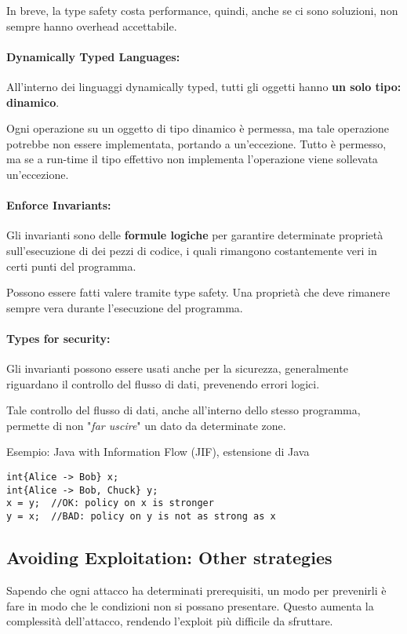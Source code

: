 In breve, la type safety costa performance, quindi, anche se ci sono soluzioni, non sempre hanno overhead accettabile. 

\paragraph{Dynamically Typed Languages:} All'interno dei linguaggi dynamically typed, tutti gli oggetti hanno \textbf{un solo tipo: dinamico}. 

Ogni operazione su un oggetto di tipo dinamico è permessa, ma tale operazione potrebbe non essere implementata, portando a un'eccezione. Tutto è permesso, ma se a run-time il tipo effettivo non implementa l'operazione viene sollevata un'eccezione.

\paragraph{Enforce Invariants:} Gli invarianti sono delle \textbf{formule logiche} per garantire determinate proprietà sull'esecuzione di dei pezzi di codice, i quali rimangono costantemente veri in certi punti del programma. 

Possono essere fatti valere tramite type safety. Una proprietà che deve rimanere sempre vera durante l'esecuzione del programma.

\paragraph{Types for security:} Gli invarianti possono essere usati anche per la sicurezza, generalmente riguardano il controllo del flusso di dati, prevenendo errori logici.

Tale controllo del flusso di dati, anche all'interno dello stesso programma, permette di non "\textit{far uscire}" un dato da determinate zone.

Esempio: Java with Information Flow (JIF), estensione di Java
\begin{verbatim}
int{Alice -> Bob} x;
int{Alice -> Bob, Chuck} y;
x = y;  //OK: policy on x is stronger
y = x;  //BAD: policy on y is not as strong as x
\end{verbatim}

\subsection{Avoiding Exploitation: Other strategies}

Sapendo che ogni attacco ha determinati prerequisiti, un modo per prevenirli è fare in modo che le condizioni non si possano presentare. Questo aumenta la complessità dell'attacco, rendendo l'exploit più difficile da sfruttare.

